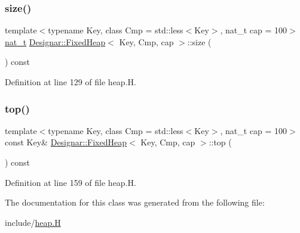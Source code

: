 \subsubsection{\texorpdfstring{size()}{size()}}
{\footnotesize\ttfamily template$<$typename Key, class Cmp = std\+::less$<$\+Key$>$, nat\+\_\+t cap = 100$>$ \\
\hyperlink{namespace_designar_aa72662848b9f4815e7bf31a7cf3e33d1}{nat\+\_\+t} \hyperlink{class_designar_1_1_fixed_heap}{Designar\+::\+Fixed\+Heap}$<$ Key, Cmp, cap $>$\+::size (\begin{DoxyParamCaption}{ }\end{DoxyParamCaption}) const\hspace{0.3cm}{\ttfamily [inline]}}



Definition at line 129 of file heap.\+H.

\mbox{\label{class_designar_1_1_fixed_heap_a2b48592e01a0b8836a18415219a310ca}} 
\subsubsection{\texorpdfstring{top()}{top()}}
{\footnotesize\ttfamily template$<$typename Key, class Cmp = std\+::less$<$\+Key$>$, nat\+\_\+t cap = 100$>$ \\
const Key\& \hyperlink{class_designar_1_1_fixed_heap}{Designar\+::\+Fixed\+Heap}$<$ Key, Cmp, cap $>$\+::top (\begin{DoxyParamCaption}{ }\end{DoxyParamCaption}) const\hspace{0.3cm}{\ttfamily [inline]}}



Definition at line 159 of file heap.\+H.



The documentation for this class was generated from the following file\+:\begin{DoxyCompactItemize}
\item 
include/\hyperlink{heap_8_h}{heap.\+H}\end{DoxyCompactItemize}
